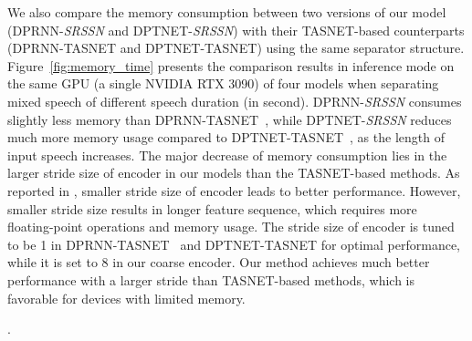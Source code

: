 We also compare the memory consumption  between two versions of our model (DPRNN-\emph{SRSSN} and DPTNET-\emph{SRSSN}) with their TASNET-based counterparts (DPRNN-TASNET and DPTNET-TASNET) using the same separator structure. Figure~\ref{fig:memory_time} presents the comparison results in inference mode on the same GPU (a single NVIDIA RTX 3090) of four models when separating mixed speech of different speech duration (in second).
DPRNN-\emph{SRSSN} consumes slightly less memory than DPRNN-TASNET~\cite{DPRNN}, while DPTNET-\emph{SRSSN} reduces much more memory usage compared to DPTNET-TASNET~\cite{DPTNet}, as the length of input speech increases.
The major decrease of memory consumption lies in the larger stride size of encoder in our models than the TASNET-based methods. As reported in \cite{DPRNN}, smaller stride size of encoder leads to better performance. 
However, smaller stride size results in longer feature sequence, which requires more floating-point operations and memory usage. The stride size of encoder is tuned to be 1 in DPRNN-TASNET~\cite{DPRNN} and DPTNET-TASNET\cite{DPTNet} for optimal performance, while it is set to 8 in our coarse encoder. Our method achieves much better performance with a larger stride than TASNET-based methods, which is favorable for devices with limited memory.

.







